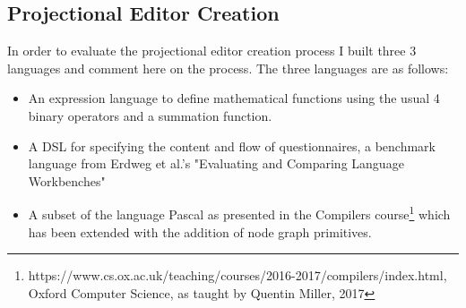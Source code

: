 \documentclass{article}
\begin{document}
{\subsection{Projectional Editor Creation}\label{creationEvaluation}
In order to evaluate the projectional editor creation process I built three 3 languages and comment here on the process. The three languages are as follows:
\begin{itemize}
\item An expression language to define mathematical functions using the usual 4 binary operators and a summation function.
\item A DSL for specifying the content and flow of questionnaires, a benchmark language from Erdweg et al.'s "Evaluating and Comparing Language Workbenches"~\cite{languageWorkbenchChallenge}
\item A subset of the language Pascal as presented in the Compilers course\footnote{https://www.cs.ox.ac.uk/teaching/courses/2016-2017/compilers/index.html, Oxford Computer Science, as taught by Quentin Miller, 2017} which has been extended with the addition of node graph primitives. 
\end{itemize}
%
}
\end{document}
